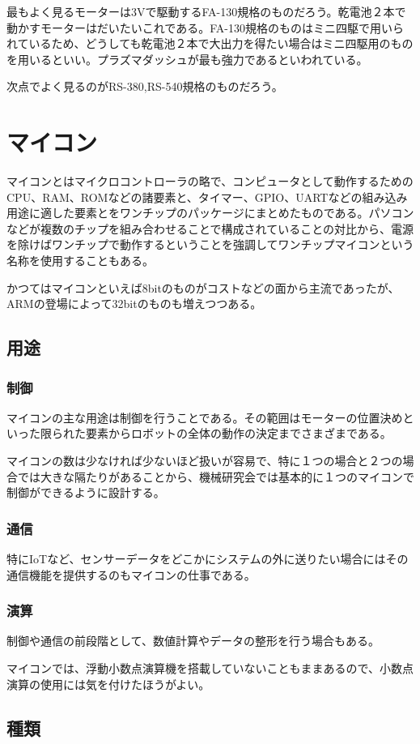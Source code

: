 \documentclass[a4paper,titlepage,here]{ujarticle}
\begin{document}
最もよく見るモーターは3Vで駆動するFA-130規格のものだろう。乾電池２本で動かすモーターはだいたいこれである。FA-130規格のものはミニ四駆で用いられているため、どうしても乾電池２本で大出力を得たい場合はミニ四駆用のものを用いるといい。プラズマダッシュが最も強力であるといわれている。

次点でよく見るのがRS-380,RS-540規格のものだろう。
\section{マイコン}
マイコンとはマイクロコントローラの略で、コンピュータとして動作するためのCPU、RAM、ROMなどの諸要素と、タイマー、GPIO、UARTなどの組み込み用途に適した要素とをワンチップのパッケージにまとめたものである。パソコンなどが複数のチップを組み合わせることで構成されていることの対比から、電源を除けばワンチップで動作するということを強調してワンチップマイコンという名称を使用することもある。

かつてはマイコンといえば8bitのものがコストなどの面から主流であったが、ARMの登場によって32bitのものも増えつつある。

\subsection{用途}
\subsubsection{制御}
マイコンの主な用途は制御を行うことである。その範囲はモーターの位置決めといった限られた要素からロボットの全体の動作の決定までさまざまである。

マイコンの数は少なければ少ないほど扱いが容易で、特に１つの場合と２つの場合では大きな隔たりがあることから、機械研究会では基本的に１つのマイコンで制御ができるように設計する。
\subsubsection{通信}
特にIoTなど、センサーデータをどこかにシステムの外に送りたい場合にはその通信機能を提供するのもマイコンの仕事である。
\subsubsection{演算}
制御や通信の前段階として、数値計算やデータの整形を行う場合もある。

マイコンでは、浮動小数点演算機を搭載していないこともままあるので、小数点演算の使用には気を付けたほうがよい。
\subsection{種類}
\end{document}
